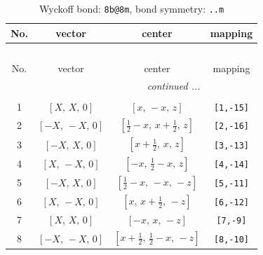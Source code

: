 \documentclass[fleqn,8pt]{jsarticle}
\begin{document}
\renewcommand{\arraystretch}{1.2}
\begin{longtable}{cccc}
\caption{Wyckoff bond: {\tt 8b@8m}, bond symmetry: {\tt ..m}}
 \\
 \hline \hline
No. & vector & center & mapping \\ \hline \endfirsthead

\multicolumn{3}{l}{\tablename\ \thetable{}} \\
 \hline \hline
No. & vector & center & mapping \\ \hline \endhead

 \hline \hline
\multicolumn{3}{r}{\footnotesize\it continued ...} \\ \endfoot

 \hline \hline
\multicolumn{3}{r}{} \\ \endlastfoot

1 & $\left[ X,\, X,\, 0 \right]$ & $\left[ x,\, - x,\, z \right]$ & {\tt [1,-15]} \\ \hline
2 & $\left[ - X,\, - X,\, 0 \right]$ & $\left[ \frac{1}{2} - x,\, x + \frac{1}{2},\, z \right]$ & {\tt [2,-16]} \\ \hline
3 & $\left[ - X,\, X,\, 0 \right]$ & $\left[ x + \frac{1}{2},\, x,\, z \right]$ & {\tt [3,-13]} \\ \hline
4 & $\left[ X,\, - X,\, 0 \right]$ & $\left[ - x,\, \frac{1}{2} - x,\, z \right]$ & {\tt [4,-14]} \\ \hline
5 & $\left[ - X,\, X,\, 0 \right]$ & $\left[ \frac{1}{2} - x,\, - x,\, - z \right]$ & {\tt [5,-11]} \\ \hline
6 & $\left[ X,\, - X,\, 0 \right]$ & $\left[ x,\, x + \frac{1}{2},\, - z \right]$ & {\tt [6,-12]} \\ \hline
7 & $\left[ X,\, X,\, 0 \right]$ & $\left[ - x,\, x,\, - z \right]$ & {\tt [7,-9]} \\ \hline
8 & $\left[ - X,\, - X,\, 0 \right]$ & $\left[ x + \frac{1}{2},\, \frac{1}{2} - x,\, - z \right]$ & {\tt [8,-10]} \\
\end{longtable}
\renewcommand{\arraystretch}{1.2}
\end{document}

